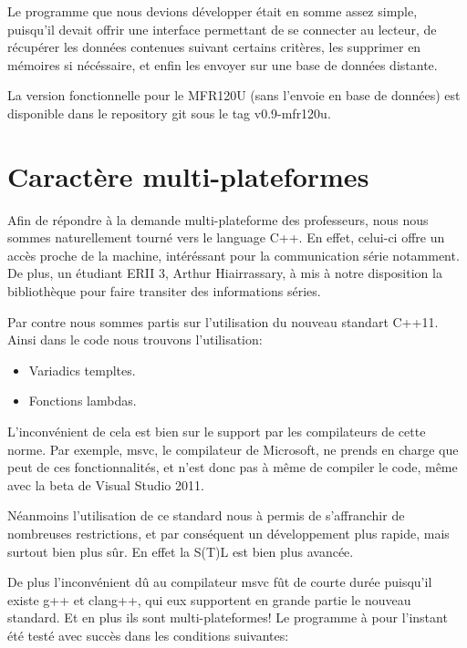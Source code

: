     Le programme que nous devions développer était en somme assez simple, puisqu'il
devait offrir une interface permettant de se connecter au lecteur, de récupérer les
données contenues suivant certains critères, les supprimer en mémoires si nécéssaire,
et enfin les envoyer sur une base de données distante.

    La version fonctionnelle pour le MFR120U (sans l'envoie en base de données)
est disponible dans le repository git sous le tag v0.9-mfr120u.



\section{Caractère multi-plateformes}
    Afin de répondre à la demande multi-plateforme des professeurs, nous nous 
sommes naturellement tourné vers le language C++. En effet, celui-ci offre un accès
proche de la machine, intéréssant pour la communication série notamment. De plus,
un étudiant ERII 3, Arthur Hiairrassary, à mis à notre disposition la bibliothèque
pour faire transiter des informations séries.

    Par contre nous sommes partis sur l'utilisation du nouveau standart C++11. Ainsi
dans le code nous trouvons l'utilisation:

    \begin{itemize}
        \item Variadics templtes.
        \item Fonctions lambdas.
    \end{itemize}

    L'inconvénient de cela est bien sur le support par les compilateurs de cette
norme. Par exemple, msvc, le compilateur de Microsoft, ne prends en charge que peut
de ces fonctionnalités, et n'est donc pas à même de compiler le code, même avec la
beta de Visual Studio 2011.

    Néanmoins l'utilisation de ce standard nous à permis de s'affranchir de nombreuses
restrictions, et par conséquent un développement plus rapide, mais surtout bien
plus sûr. En effet la S(T)L est bien plus avancée.

    De plus l'inconvénient dû au compilateur msvc fût de courte durée puisqu'il
existe g++ et clang++, qui eux supportent en grande partie le nouveau standard.
Et en plus ils sont multi-plateformes! Le programme à pour l'instant été testé 
avec succès dans les conditions suivantes:

